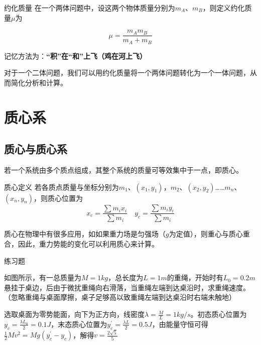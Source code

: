 \begin{defi}{约化质量}{}
在一个两体问题中，设这两个物体质量分别为$m_A$、$m_B$，则定义约化质量$\mu$为

$$\mu = \frac{m_A m_B}{m_A + m_B}$$

记忆方法为：\textbf{“积”在“和”上飞（鸡在河上飞）}
\end{defi}

对于一个二体问题，我们可以用约化质量将一个两体问题转化为一个一体问题，从而简化分析和计算。

\section{质心系}

\subsection{质心与质心系}

若一个系统由多个质点组成，其整个系统的质量可等效集中于一点，即质心。

\begin{defi}[label=zxdy]{质心定义}{}
若各质点质量与坐标分别为$m_1$、$(x_1,y_1)$，$m_2$、$(x_2,y_2)$……$m_n$、$(x_n,y_n)$，则质心位置为
$$x_c = \frac{\sum m_i x_i}{\sum m_i} \quad y_c = \frac{\sum m_i y_i}{\sum m_i}$$
\end{defi}

质心在物理中有很多应用，如如果重力场是匀强场（$g$为定值），则重心与质心重合，因此，重力势能的变化可以利用质心来计算。

\begin{ep}{练习题}{}

如图所示，有一总质量为$M=1kg$，总长度为$L=1m$的重绳，开始时有$L_0 = 0.2m$悬挂于桌边，后由于微扰重绳向右滑落，当重绳左端到达桌沿时，求重绳速度。（忽略重绳与桌面摩擦，桌子足够高以致重绳左端到达桌沿时右端未触地）
~\\

\begin{minipage}[b]{0.65\linewidth}
选取桌面为零势能面，向下为正方向，线密度$\lambda = \frac{M}{L} = 1kg/s$。初态质心位置为$y_c = \frac{\lambda L_0}{2} = 0.1J$，末态质心位置为$y_c^{\prime} = \frac{\lambda L}{2} = 0.5J$，由能量守恒可得$\frac{1}{2} M v^2 = Mg(y_c^{\prime}-y_c)$，解得$v = \frac{2\sqrt{5}}{5}$
\end{minipage}
\hfill
\begin{minipage}[b]{0.35\linewidth}

\end{minipage}
\end{ep}

